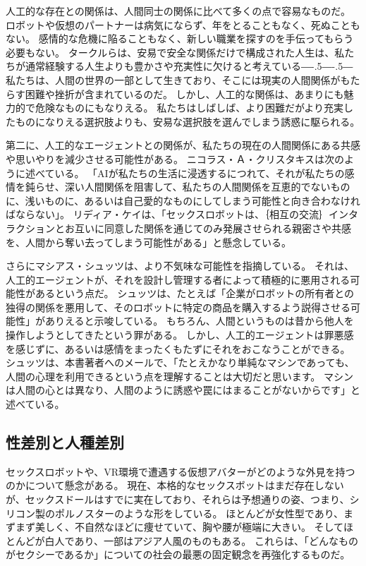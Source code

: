 \documentclass[paper=a4,book,openany]{jlreq}
\def\DDASH{―\kern-.5\zw―\kern-.5\zw―} %
\begin{document}
人工的な存在との関係は、人間同士の関係に比べて多くの点で容易なものだ。
ロボットや仮想のパートナーは病気にならず、年をとることもなく、死ぬこともない。
感情的な危機に陥ることもなく、新しい職業を探すのを手伝ってもらう必要もない。
タークルらは、安易で安全な関係だけで構成された人生は、私たちが通常経験する人生よりも豊かさや充実性に欠けると考えている{\DDASH}
私たちは、人間の世界の一部として生きており、そこには現実の人間関係がもたらす困難や挫折が含まれているのだ。
しかし、人工的な関係は、あまりにも魅力的で危険なものにもなりえる。
私たちはしばしば、より困難だがより充実したものになりえる選択肢よりも、安易な選択肢を選んでしまう誘惑に駆られる。

第二に、人工的なエージェントとの関係が、私たちの現在の人間関係にある共感や思いやりを減少させる可能性がある。
ニコラス・Ａ・クリスタキスは次のように述べている。
「AIが私たちの生活に浸透するにつれて、それが私たちの感情を鈍らせ、深い人間関係を阻害して、私たちの人間関係を互恵的でないものに、浅いものに、あるいは自己愛的なものにしてしまう可能性と向き合わなければならない」\citep{christakis19:_how_ai_will_rewir_us}。
リディア・ケイは、「セックスロボットは、｛相互の交流｝{インタラクション}とお互いに同意した関係を通じてのみ発展させられる親密さや共感を、人間から奪い去ってしまう可能性がある」と懸念している\citep{responsible17:_our_sexual_futur_robot}。

さらにマシアス・シュッツは、より不気味な可能性を指摘している。
それは、人工的エージェントが、それを設計し管理する者によって積極的に悪用される可能性があるという点だ。
シュッツは、たとえば「企業がロボットの所有者との独得の関係を悪用して、そのロボットに特定の商品を購入するよう説得させる可能性」がありえると示唆している。
もちろん、人間というものは昔から他人を操作しようとしてきたという罪がある。
しかし、人工的エージェントは罪悪感を感じずに、あるいは感情をまったくもたずにそれをおこなうことができる。
シュッツは、本書著者へのメールで、「たとえかなり単純なマシンであっても、人間の心理を利用できるという点を理解することは大切だと思います。
マシンは人間の心とは異なり、人間のように誘惑や罠にはまることがないからです」と述べている。

\subsection{性差別と人種差別}

セックスロボットや、VR環境で遭遇する仮想アバターがどのような外見を持つのかについて懸念がある。
現在、本格的なセックスボットはまだ存在しないが、セックスドールはすでに実在しており、それらは予想通りの姿、つまり、シリコン製のポルノスターのような形をしている。
ほとんどが女性型であり、まずまず美しく、不自然なほどに痩せていて、胸や腰が極端に大きい。
そしてほとんどが白人であり、一部はアジア人風のものもある。
これらは、「どんなものがセクシーであるか」についての社会の最悪の固定観念を再強化するものだ。
\end{document}

